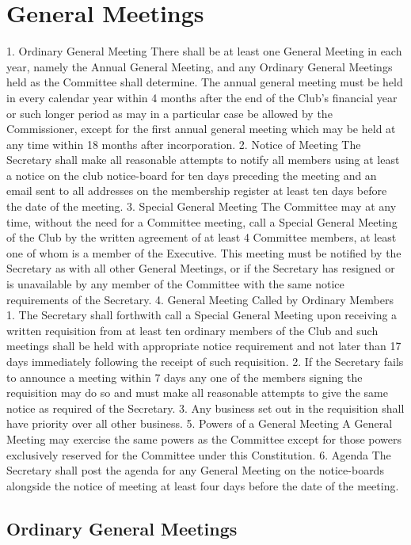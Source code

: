 \documentclass[12pt]{article} %
\begin{document}
\section{General Meetings}
1. Ordinary General Meeting
There shall be at least one General Meeting in each year, namely the Annual General
Meeting, and any Ordinary General Meetings held as the Committee shall determine.
The annual general meeting must be held in every calendar year within 4 months after
the end of the Club's financial year or such longer period as may in a particular case
be allowed by the Commissioner, except for the first annual general meeting which
may be held at any time within 18 months after incorporation.
2. Notice of Meeting
The Secretary shall make all reasonable attempts to notify all members using at least
a notice on the club notice-board for ten days preceding the meeting and an email sent
to all addresses on the membership register at least ten days before the date of the
meeting.
3. Special General Meeting
The Committee may at any time, without the need for a Committee meeting, call a
Special General Meeting of the Club by the written agreement of at least 4
Committee members, at least one of whom is a member of the Executive. This
meeting must be notified by the Secretary as with all other General Meetings, or if the
Secretary has resigned or is unavailable by any member of the Committee with the
same notice requirements of the Secretary.
4. General Meeting Called by Ordinary Members
1. The Secretary shall forthwith call a Special General Meeting upon receiving a
written requisition from at least ten ordinary members of the Club and such
meetings shall be held with appropriate notice requirement and not later than
17 days immediately following the receipt of such requisition.
2. If the Secretary fails to announce a meeting within 7 days any one of the
members signing the requisition may do so and must make all reasonable
attempts to give the same notice as required of the Secretary.
3. Any business set out in the requisition shall have priority over all other
business.
5. Powers of a General Meeting
A General Meeting may exercise the same powers as the Committee except for those
powers exclusively reserved for the Committee under this Constitution.
6. Agenda
The Secretary shall post the agenda for any General Meeting on the notice-boards
alongside the notice of meeting at least four days before the date of the meeting.
\subsection{Ordinary General Meetings}
\end{document}
